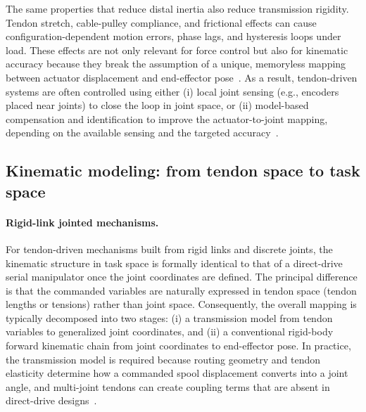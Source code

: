 The same properties that reduce distal inertia also reduce transmission rigidity. Tendon stretch, cable-pulley compliance, and frictional effects can cause configuration-dependent motion errors, phase lags, and hysteresis loops under load. These effects are not only relevant for force control but also for kinematic accuracy because they break the assumption of a unique, memoryless mapping between actuator displacement and end-effector pose~\cite{Miyasaka2020HysteresisFriction,Kato2016Neuroendoscopy}. As a result, tendon-driven systems are often controlled using either (i) local joint sensing (e.g., encoders placed near joints) to close the loop in joint space, or (ii) model-based compensation and identification to improve the actuator-to-joint mapping, depending on the available sensing and the targeted accuracy~\cite{Miyasaka2020HysteresisFriction}.

\subsection{Kinematic modeling: from tendon space to task space}

\paragraph{Rigid-link jointed mechanisms.}
For tendon-driven mechanisms built from rigid links and discrete joints, the kinematic structure in task space is formally identical to that of a direct-drive serial manipulator once the joint coordinates are defined. The principal difference is that the commanded variables are naturally expressed in tendon space (tendon lengths or tensions) rather than joint space. Consequently, the overall mapping is typically decomposed into two stages: (i) a transmission model from tendon variables to generalized joint coordinates, and (ii) a conventional rigid-body forward kinematic chain from joint coordinates to end-effector pose. In practice, the transmission model is required because routing geometry and tendon elasticity determine how a commanded spool displacement converts into a joint angle, and multi-joint tendons can create coupling terms that are absent in direct-drive designs~\cite{Miyasaka2020HysteresisFriction}.

